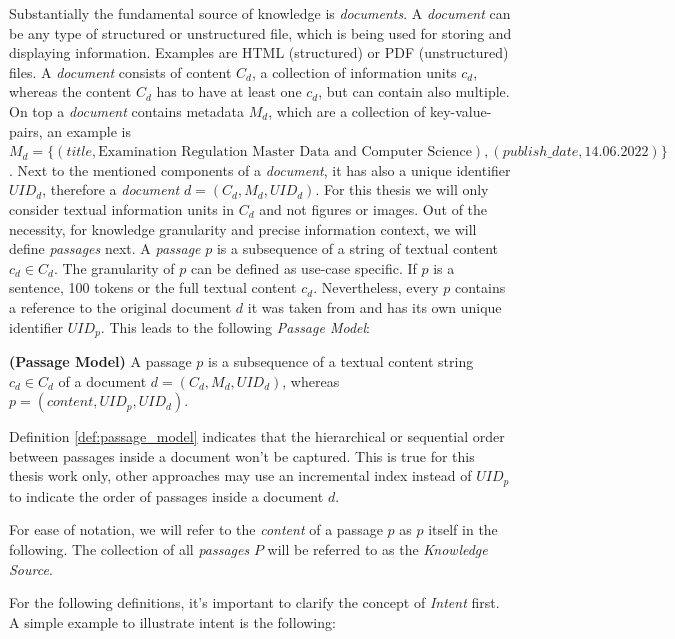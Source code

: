 Substantially the fundamental source of knowledge is \textit{documents}. A \textit{document} can be any type of structured or unstructured file, which is being used for storing and displaying information. Examples are HTML (structured) or PDF (unstructured) files. A \textit{document} consists of content $C_d$, a collection of information units $c_d$, whereas the content $C_d$ has to have at least one $c_d$, but can contain also multiple. On top a \textit{document} contains metadata $M_d$, which are a collection of key-value-pairs, an example is $M_d = \{(title,\text{Examination Regulation Master Data and Computer Science}),\allowbreak (publish\_date \allowbreak, 14.06.2022)\}$. Next to the mentioned components of a \textit{document}, it has also a unique identifier $UID_d$, therefore a \textit{document} $d = (C_d, M_d, UID_d)$. For this thesis we will only consider textual information units in $C_d$ and not figures or images. Out of the necessity, for knowledge granularity and precise information context, we will define \textit{passages} next. A \textit{passage} $p$ is a subsequence of a string of textual content $c_d \in C_d$. The granularity of $p$ can be defined as use-case specific. If $p$ is a sentence, 100 tokens or the full textual content $c_d$. Nevertheless, every $p$ contains a reference to the original document $d$ it was taken from and has its own unique identifier $UID_p$. This leads to the following \textit{Passage Model}:
\begin{definition}
    \textbf{(Passage Model)} A passage $p$ is a subsequence of a textual content string $c_d \in C_d$ of a document $d = (C_d,M_d, UID_d)$, whereas $p = (content, UID_p, UID_d)$.
    \label{def:passage_model}
\end{definition}

Definition \ref{def:passage_model} indicates that the hierarchical or sequential order between passages inside a document won't be captured. This is true for this thesis work only, other approaches may use an incremental index instead of $UID_p$ to indicate the order of passages inside a document $d$.

For ease of notation, we will refer to the \textit{content} of a passage $p$ as $p$ itself in the following. The collection of all \textit{passages} $P$ will be referred to as the \textit{Knowledge Source}. 

For the following definitions, it's important to clarify the concept of \textit{Intent} first. A simple example to illustrate intent is the following:

